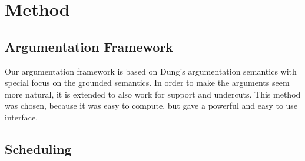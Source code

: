 \section{Method}

\subsection{Argumentation Framework}
Our argumentation framework is based on Dung's argumentation semantics
\cite{dungargfund} with special focus on the grounded semantics. In order
to make the arguments seem more natural, it is extended to also work for
support and undercuts. This method was chosen, because it was easy to
compute, but gave a powerful and easy to use interface.

\subsection{Scheduling}

